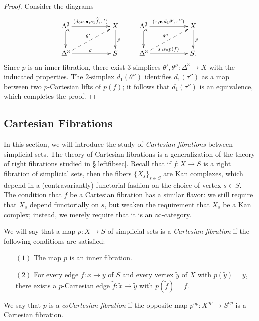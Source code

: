 \begin{proof}
Consider the diagrams
$$ \xymatrix{ \Lambda^3_1 \ar[rr]^{ (d_0 \sigma, \bigdot, s_1 \widetilde{f}, \tau')} \ar@{^{(}->}[d] & & X \ar[d]^{p} &  \Lambda^3_1 \ar[rr]^{ (\tau, \bigdot, d_1 \theta', \tau'') } \ar@{^{(}->}[d] & & X \ar[d]^{p} \\
\Delta^3 \ar@{-->}[urr]^{\theta'} \ar[rr]^{\sigma} & & S & \Delta^3 \ar[rr]^{ s_0 s_0 p(f)} \ar@{-->}[urr]^{\theta''} & & S. }$$
Since $p$ is an inner fibration, there exist $3$-simplices $\theta', \theta'': \Delta^3 \rightarrow X$ with the inducated properties. The $2$-simplex $d_1(\theta'')$ identifies $d_1(\tau'')$ as a map between two
$p$-Cartesian lifts of $p(f)$; it follows that $d_1(\tau'')$ is an equivalence, which completes the proof.
\end{proof}

\subsection{Cartesian Fibrations}\label{funkymid}

In this section, we will introduce the study of {\it Cartesian fibrations} between simplicial sets. The theory of Cartesian fibrations is a generalization of the theory of right fibrations studied in \S \ref{leftfibsec}. Recall that if $f: X \rightarrow S$
is a right fibration of simplicial sets, then the fibers $\{ X_{s} \}_{s \in S}$
are Kan complexes, which depend in a (contravariantly) functorial fashion on
the choice of vertex $s \in S$. The condition that $f$ be a Cartesian fibration has a similar flavor: we still require that $X_{s}$ depend functorially on $s$, but weaken the requirement that $X_{s}$ be a Kan complex; instead, we merely require that it is an $\infty$-category.

\begin{definition}\label{defcart}
We will say that a map $p: X \rightarrow S$ of simplicial sets is a {\it Cartesian fibration} if the following conditions are satisfied:
\begin{itemize}
\item[$(1)$] The map $p$ is an inner fibration.
\item[$(2)$] For every edge $f: x \rightarrow y$ of $S$ and every vertex $\widetilde{y}$
of $X$ with $p(\widetilde{y}) = y$, there exists a $p$-Cartesian edge $\widetilde{f}: \widetilde{x} \rightarrow \widetilde{y}$ with $p(\widetilde{f}) = f$.
\end{itemize}

We say that $p$ is a {\it coCartesian fibration} if the opposite map $p^{op}: X^{op} \rightarrow S^{op}$ is a Cartesian fibration.
\end{definition}

